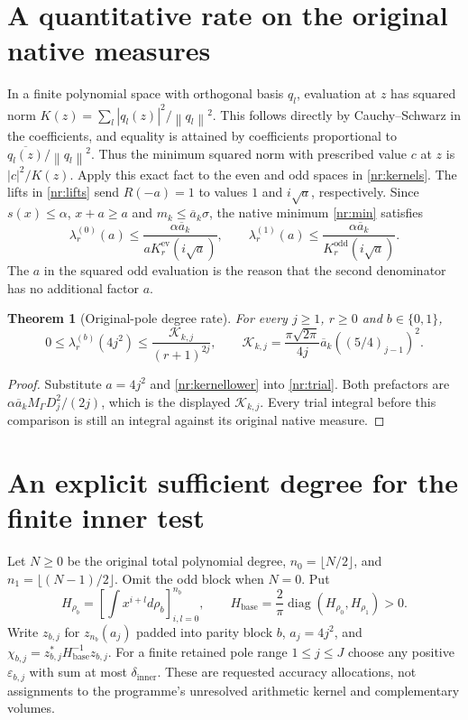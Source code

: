 \documentclass[11pt]{article}
\newtheorem{theorem}{Theorem}
\newcommand{\norm}[1]{\left\lVert#1\right\rVert}
\begin{document}
\section{A quantitative rate on the original native measures}

In a finite polynomial space with orthogonal basis $q_l$, evaluation
at $z$ has squared norm $K(z)=\sum_l|q_l(z)|^2/\norm{q_l}^2$.
This follows directly by Cauchy--Schwarz in the coefficients, and
equality is attained by coefficients proportional to
$\overline{q_l(z)}/\norm{q_l}^2$. Thus the minimum squared norm
with prescribed value $c$ at $z$ is $|c|^2/K(z)$.
Apply this exact fact to the even and odd spaces in
\eqref{nr:kernels}. The lifts in \eqref{nr:lifts} send $R(-a)=1$
to values $1$ and $i\sqrt a$, respectively. Since
$s(x)\le\alpha$, $x+a\ge a$ and $m_k\le\overline a_k\sigma$,
the native minimum \eqref{nr:min} satisfies
\begin{equation}\tag{NR16}\label{nr:trial}
 \lambda_r^{(0)}(a)\le
 \frac{\alpha\overline a_k}{aK_r^{\mathrm{ev}}(i\sqrt a)},\qquad
 \lambda_r^{(1)}(a)\le
 \frac{\alpha\overline a_k}{K_r^{\mathrm{odd}}(i\sqrt a)}.
\end{equation}
The $a$ in the squared odd evaluation is the reason that the
second denominator has no additional factor $a$.

\begin{theorem}[Original-pole degree rate]
For every $j\ge1$, $r\ge0$ and $b\in\{0,1\}$,
\begin{equation}\tag{NR17}\label{nr:rate}
 0\le\lambda_r^{(b)}(4j^2)
 \le\frac{\mathcal K_{k,j}}{(r+1)^{2j}},\qquad
 \mathcal K_{k,j}=
 \frac{\pi\sqrt{2\pi}}{4j}\overline a_k((5/4)_{j-1})^2.
\end{equation}
\end{theorem}
\begin{proof}
Substitute $a=4j^2$ and \eqref{nr:kernellower} into
\eqref{nr:trial}. Both prefactors are
$\alpha\overline a_k M_\Gamma D_j^2/(2j)$, which is the displayed
$\mathcal K_{k,j}$. Every trial integral before this comparison
is still an integral against its original native measure.
\end{proof}

\section{An explicit sufficient degree for the finite inner test}

Let $N\ge0$ be the original total polynomial degree,
$n_0=\lfloor N/2\rfloor$, and $n_1=\lfloor(N-1)/2\rfloor$.
Omit the odd block when $N=0$. Put
\[
 H_{\rho_b}=[\textstyle\int x^{i+l}d\rho_b]_{i,l=0}^{n_b},\qquad
 H_{\mathrm{base}}=\frac2\pi
       \operatorname{diag}(H_{\rho_0},H_{\rho_1})>0.
\]
Write $z_{b,j}$ for $z_{n_b}(a_j)$ padded into parity block $b$,
$a_j=4j^2$, and
$\chi_{b,j}=z_{b,j}^*H_{\mathrm{base}}^{-1}z_{b,j}$.
For a finite retained pole range $1\le j\le J$ choose any positive
$\varepsilon_{b,j}$ with sum at most $\delta_{\mathrm{inner}}$.
These are requested accuracy allocations, not assignments to the
programme's unresolved arithmetic kernel and complementary volumes.
\end{document}
